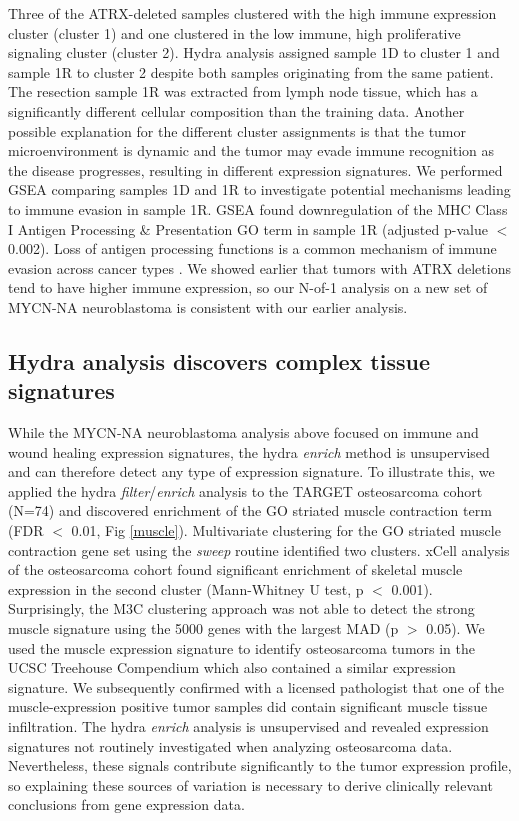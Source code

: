 \documentclass[10pt,letterpaper]{article}
\begin{document}
Three of the ATRX-deleted samples clustered with the high immune expression cluster (cluster 1) and one clustered in the low immune, high proliferative signaling cluster (cluster 2). Hydra analysis assigned sample 1D to cluster 1 and sample 1R to cluster 2 despite both samples originating from the same patient. The resection sample 1R was extracted from lymph node tissue, which has a significantly different cellular composition than the training data. Another possible explanation for the different cluster assignments is that the tumor microenvironment is dynamic and the tumor may evade immune recognition as the disease progresses, resulting in different expression signatures. We performed GSEA comparing samples 1D and 1R to investigate potential mechanisms leading to immune evasion in sample 1R. GSEA found downregulation of the MHC Class I Antigen Processing \& Presentation GO term in sample 1R (adjusted p-value $<$ 0.002). Loss of antigen processing functions is a common mechanism of immune evasion across cancer types \cite{reevesAntigenProcessingImmune2017}. We showed earlier that tumors with ATRX deletions tend to have higher immune expression, so our N-of-1 analysis on a new set of MYCN-NA neuroblastoma is consistent with our earlier analysis.


\subsection*{Hydra analysis discovers complex tissue signatures}
While the MYCN-NA neuroblastoma analysis above focused on immune and wound healing expression signatures, the hydra \textit{enrich} method is unsupervised and can therefore detect any type of expression signature. To illustrate this, we applied the hydra \textit{filter}/\textit{enrich} analysis to the TARGET osteosarcoma cohort (N=74) and discovered enrichment of the GO striated muscle contraction term (FDR $<$ 0.01, Fig \ref{muscle}). Multivariate clustering for the GO striated muscle contraction gene set using the \textit{sweep} routine identified two clusters. xCell analysis of the osteosarcoma cohort found significant enrichment of skeletal muscle expression in the second cluster (Mann-Whitney U test, p $<$ 0.001). Surprisingly, the M3C clustering approach was not able to detect the strong muscle signature using the 5000 genes with the largest MAD (p $>$ 0.05). We used the muscle expression signature to identify osteosarcoma tumors in the UCSC Treehouse Compendium which also contained a similar expression signature. We subsequently confirmed with a licensed pathologist that one of the muscle-expression positive tumor samples did contain significant muscle tissue infiltration. The hydra \textit{enrich} analysis is unsupervised and revealed expression signatures not routinely investigated when analyzing osteosarcoma data. Nevertheless, these signals contribute significantly to the tumor expression profile, so explaining these sources of variation is necessary to derive clinically relevant conclusions from gene expression data.
\end{document}
